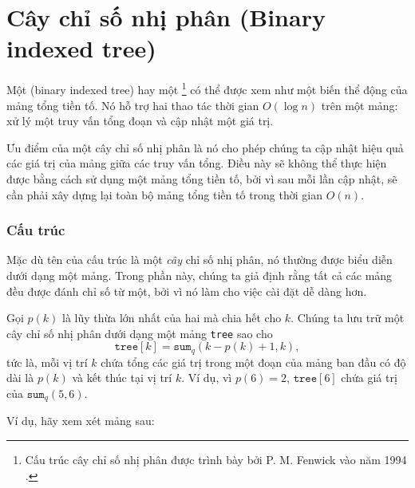 \section{Cây chỉ số nhị phân (Binary indexed tree)}


Một  (binary indexed tree) hay một \footnote{Cấu trúc
cây chỉ số nhị phân được trình bày bởi P. M. Fenwick vào năm 1994 \cite{fen94}.}
có thể được xem như một biến thể động của mảng tổng tiền tố.
Nó hỗ trợ hai thao tác thời gian $O(\log n)$ trên một mảng:
xử lý một truy vấn tổng đoạn và cập nhật một giá trị.

Ưu điểm của một cây chỉ số nhị phân là
nó cho phép chúng ta cập nhật hiệu quả
các giá trị của mảng giữa các truy vấn tổng.
Điều này sẽ không thể thực hiện được bằng cách sử dụng một mảng tổng tiền tố,
bởi vì sau mỗi lần cập nhật, sẽ cần phải xây dựng lại
toàn bộ mảng tổng tiền tố trong thời gian $O(n)$.

\subsubsection{Cấu trúc}

Mặc dù tên của cấu trúc là một \emph{cây} chỉ số nhị phân,
nó thường được biểu diễn dưới dạng một mảng.
Trong phần này, chúng ta giả định rằng tất cả các mảng đều được đánh chỉ số từ một,
bởi vì nó làm cho việc cài đặt dễ dàng hơn.

Gọi $p(k)$ là lũy thừa lớn nhất của hai mà
chia hết cho $k$.
Chúng ta lưu trữ một cây chỉ số nhị phân dưới dạng một mảng \texttt{tree}
sao cho
\[ \texttt{tree}[k] = \texttt{sum}_q(k-p(k)+1,k),\]
tức là, mỗi vị trí $k$ chứa tổng các giá trị
trong một đoạn của mảng ban đầu có độ dài là $p(k)$
và kết thúc tại vị trí $k$.
Ví dụ, vì $p(6)=2$, $\texttt{tree}[6]$
chứa giá trị của $\texttt{sum}_q(5,6)$.

Ví dụ, hãy xem xét mảng sau:
\begin{center}
\end{center}

